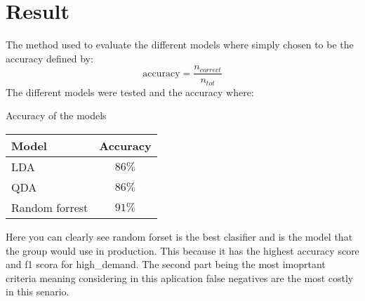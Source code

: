 \section{Result}

The method used to evaluate the different models where simply chosen to be the accuracy defined by:
\begin{equation*}
    \text{accuracy} = \frac{n_{correct}}{n_{tot}}
\end{equation*}
The different models were tested and the accuracy where:
\\
\begin{table*}[h]
    \begin{center}
        Accuracy of the models
        \\
        \begin{tabular}{|l|c|}
            \hline
            Model & Accuracy \\
            \hline
            LDA & $86\%$ \\
            QDA & $86\%$ \\
            Random forrest & $91\%$\\
            \hline
        \end{tabular}
    \end{center}
\end{table*}

Here you can clearly see random forset is the best clasifier and is the model that the group would use in production. 
This because it has the highest accuracy score and f1 scora for high_demand. 
The second part being the most imoprtant criteria meaning considering in this aplication false negatives are the most costly in this senario. 
